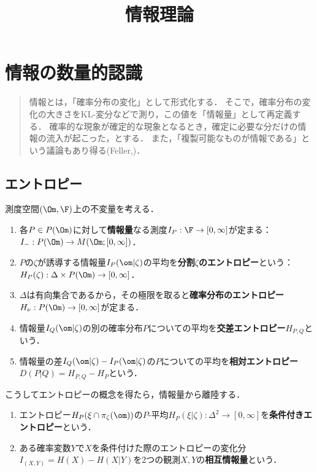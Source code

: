 \documentclass[uplatex,dvipdfmx]{jsreport}
\title{情報理論}
\author{}
\begin{document}
\tableofcontents

\chapter{情報の数量的認識}

\begin{quotation}
    情報とは，「確率分布の変化」として形式化する．
    そこで，確率分布の変化の大きさをKL-変分などで測り，この値を「情報量」として再定義する．
    確率的な現象が確定的な現象となるとき，確定に必要な分だけの情報の流入が起こった，とする．
    また，「複製可能なものが情報である」という議論もあり得る(Feller,\cite{野口悠紀雄74-情報の経済理論})．
\end{quotation}

\section{エントロピー}

\begin{tcolorbox}[colframe=ForestGreen, colback=ForestGreen!10!white,breakable,colbacktitle=ForestGreen!40!white,coltitle=black,fonttitle=\bfseries\sffamily,
title=]
    測度空間$(\Om,\F)$上の不変量を考える．
    \begin{enumerate}
        \item 各$P\in P(\Om)$に対して\textbf{情報量}なる測度$I_P:\F\to[0,\infty]$が定まる：$I_-:P(\Om)\to M(\Om;[0,\infty])$．
        \item $P$の$\zeta$が誘導する情報量$I_P(\om|\zeta)$の平均を\textbf{分割$\zeta$のエントロピー}という：$H_P(\zeta):\Delta\times P(\Om)\to[0,\infty]$．
        \item $\Delta$は有向集合であるから，その極限を取ると\textbf{確率分布のエントロピー}$H_\nu:P(\Om)\to[0,\infty]$が定まる．
        \item 情報量$I_Q(\om|\zeta)$の別の確率分布$P$についての平均を\textbf{交差エントロピー}$H_{P,Q}$という．
        \item 情報量の差$I_Q(\om|\zeta)-I_P(\om|\zeta)$の$P$についての平均を\textbf{相対エントロピー}$D(P|Q)=H_{P,Q}-H_P$という．
    \end{enumerate}
    こうしてエントロピーの概念を得たら，情報量から離陸する．
    \begin{enumerate}
        \item エントロピー$H_P(\xi\cap\pi_\zeta(\om))$の$P$-平均$H_P(\xi|\zeta):\Delta^2\to[0,\infty]$を\textbf{条件付きエントロピー}という．
        \item ある確率変数$Y$で$X$を条件付けた際のエントロピーの変化分$I_{(X,Y)}=H(X)-H(X|Y)$を2つの観測$X,Y$の\textbf{相互情報量}という．
    \end{enumerate}
\end{tcolorbox}
\end{document}
